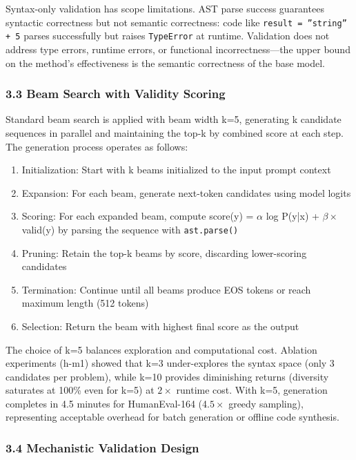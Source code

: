 Syntax-only validation has scope limitations. AST parse success guarantees syntactic correctness but not semantic correctness: code like \texttt{result = ''string'' + 5} parses successfully but raises \texttt{TypeError} at runtime. Validation does not address type errors, runtime errors, or functional incorrectness---the upper bound on the method's effectiveness is the semantic correctness of the base model.

\subsubsection{3.3 Beam Search with Validity Scoring}

Standard beam search is applied with beam width k=5, generating k candidate sequences in parallel and maintaining the top-k by combined score at each step. The generation process operates as follows:

\begin{enumerate}
\item Initialization: Start with k beams initialized to the input prompt context
\item Expansion: For each beam, generate next-token candidates using model logits
\item Scoring: For each expanded beam, compute score(y) = $\alpha$ log P(y|x) + $\beta \times$ valid(y) by parsing the sequence with \texttt{ast.parse()}
\item Pruning: Retain the top-k beams by score, discarding lower-scoring candidates
\item Termination: Continue until all beams produce EOS tokens or reach maximum length (512 tokens)
\item Selection: Return the beam with highest final score as the output
\end{enumerate}

The choice of k=5 balances exploration and computational cost. Ablation experiments (h-m1) showed that k=3 under-explores the syntax space (only 3 candidates per problem), while k=10 provides diminishing returns (diversity saturates at 100\% even for k=5) at $2\times$ runtime cost. With k=5, generation completes in 4.5 minutes for HumanEval-164 (4.$5\times$ greedy sampling), representing acceptable overhead for batch generation or offline code synthesis.

\subsubsection{3.4 Mechanistic Validation Design}

